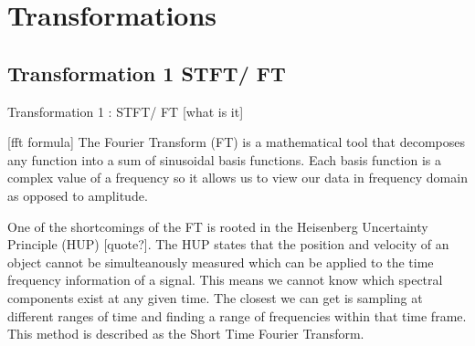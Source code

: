 \documentclass{turabian-thesis}
\begin{document}
\section{Transformations}


\subsection{Transformation 1 STFT/ FT}

Transformation 1 : STFT/ FT
[what is it]

[fft formula]
The Fourier Transform (FT) is a mathematical tool that decomposes any function into a sum of sinusoidal basis functions. Each basis function is a complex value of a frequency so it allows us to view our  data in frequency domain as opposed to amplitude.

One of the shortcomings of the FT is rooted in the Heisenberg Uncertainty Principle (HUP) [quote?]. The HUP states that the position and velocity of an object cannot be simulteanously measured which can be applied to the time frequency information of a signal. This means we cannot know which spectral components exist at any given time. The closest we can get is sampling at different ranges of time and finding a range of frequencies within that time frame. This method is described as the Short Time Fourier Transform.




\end{document}
